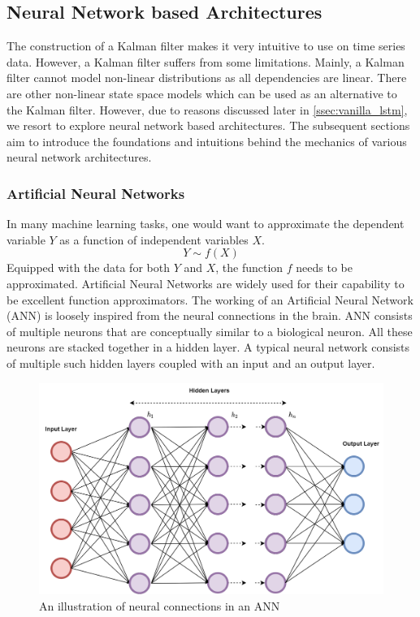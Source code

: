 \documentclass{article}
\begin{document}
\subsection{Neural Network based Architectures}
The construction of a Kalman filter makes it very intuitive to use on time series data. However, a Kalman filter suffers from some limitations. Mainly, a Kalman filter cannot model non-linear distributions as all dependencies are linear. There are other non-linear state space models which can be used as an alternative to the Kalman filter. However, due to reasons discussed later in \ref{ssec:vanilla_lstm}, we resort to explore neural network based architectures. The subsequent sections aim to introduce the foundations and intuitions behind the mechanics of various neural network architectures.  

\subsubsection{Artificial Neural Networks}
In many machine learning tasks, one would want to approximate the dependent variable $Y$ as a function of independent variables $X$.
$$Y\sim f(X)$$
Equipped with the data for both $Y$ and $X$, the function $f$ needs to be approximated. Artificial Neural Networks are widely used for their capability to be excellent function approximators. The working of an Artificial Neural Network (ANN) is loosely inspired from the neural connections in the brain. ANN consists of multiple neurons that are conceptually similar to a biological neuron. All these neurons are stacked together in a hidden layer. A typical neural network consists of multiple such hidden layers coupled with an input and an output layer. 

\begin{figure}[H]
\centering
\includegraphics[scale=0.2]{theory/ann.png}
\caption{An illustration of neural connections in an ANN}
\label{fig:ann}
\end{figure}
\end{document}
